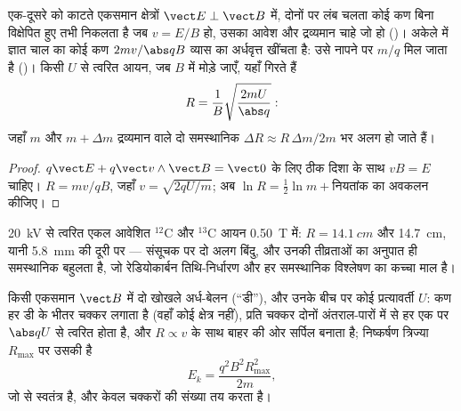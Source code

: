 \begin{proposition}\label{prop:b1:charged-particles:spectrometer}
एक-दूसरे को काटते एकसमान क्षेत्रों $\vect E \perp \vect B$ में, दोनों पर लंब
चलता कोई कण बिना विक्षेपित हुए तभी निकलता है जब $v = E/B$ हो, उसका आवेश और
द्रव्यमान चाहे जो हो (\emph{})। अकेले  में ज्ञात
चाल का कोई कण $2mv/\abs qB$ व्यास का अर्धवृत्त खींचता है: उसे नापने पर
$m/q$ मिल जाता है (\emph{})। किसी  $U$ से
त्वरित आयन, जब $B$ में मोड़े जाएँ, यहाँ गिरते हैं
\[
R = \frac{1}{B}\sqrt{\frac{2mU}{\abs q}} :
\]
जहाँ $m$ और $m + \Delta m$ द्रव्यमान वाले दो समस्थानिक $\Delta R \approx
R\,\Delta m/2m$ भर अलग हो जाते हैं।
\end{proposition}

\begin{proof}
$q\vect E + q\vect v\wedge\vect B = \vect 0$ के लिए ठीक दिशा के साथ $vB = E$
चाहिए। $R = mv/qB$, जहाँ $v = \sqrt{2qU/m}$; अब
$\ln R = \tfrac12\ln m + \text{नियतांक}$ का अवकलन कीजिए।
\end{proof}

\begin{example}[कार्बन के समस्थानिक]\label{ex:b1:charged-particles:isotopes}
\qty{20}{kV} से त्वरित एकल आवेशित $^{12}$C और $^{13}$C आयन \qty{0.50}{T}
में: $R = \qty{14.1}{cm}$ और \qty{14.7}{cm}, यानी \qty{5.8}{mm} की दूरी पर
--- संसूचक पर दो अलग बिंदु, और उनकी तीव्रताओं का अनुपात ही समस्थानिक
बहुलता है, जो रेडियोकार्बन तिथि-निर्धारण और हर समस्थानिक विश्लेषण का कच्चा
माल है।
\end{example}

\begin{proposition}[साइक्लोट्रॉन]\label{prop:b1:charged-particles:cyclotron}
किसी एकसमान $\vect B$ में दो खोखले अर्ध-बेलन (``डी''), और उनके बीच
 पर कोई प्रत्यावर्ती  $U$: कण हर डी के भीतर
चक्कर लगाता है (वहाँ कोई क्षेत्र नहीं), प्रति चक्कर दोनों अंतराल-पारों में
से हर एक पर $\abs qU$ से त्वरित होता है, और $R \propto v$ के साथ बाहर की ओर
सर्पिल बनाता है; निष्कर्षण त्रिज्या $R_{\max}$ पर उसकी  है
\[
E_k = \frac{q^2B^2R_{\max}^2}{2m},
\]
जो  से स्वतंत्र है, और  केवल चक्करों की संख्या तय करता है।
\end{proposition}

